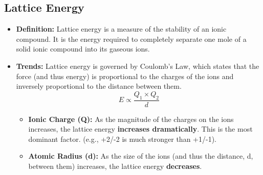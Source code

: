 \documentclass{article}
\begin{document}
\subsection*{Lattice Energy}
\begin{itemize}[itemsep=5pt]
    \item \textbf{Definition:} Lattice energy is a measure of the stability of an ionic compound. It is the energy required to completely separate one mole of a solid ionic compound into its gaseous ions.
    \item \textbf{Trends:} Lattice energy is governed by Coulomb's Law, which states that the force (and thus energy) is proportional to the charges of the ions and inversely proportional to the distance between them. 
    \[ E \propto \frac{Q_1 \times Q_2}{d} \]
    \begin{itemize}
        \item \textbf{Ionic Charge (Q):} As the magnitude of the charges on the ions increases, the lattice energy \textbf{increases dramatically}. This is the most dominant factor. (e.g., +2/-2 is much stronger than +1/-1).
        \item \textbf{Atomic Radius (d):} As the size of the ions (and thus the distance, d, between them) increases, the lattice energy \textbf{decreases}.
    \end{itemize}
\end{itemize}
\end{document}
